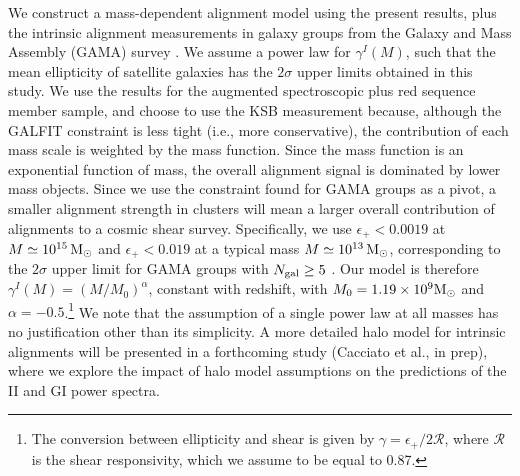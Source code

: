We construct a mass-dependent alignment model using the present results, plus the intrinsic 
alignment measurements in galaxy groups from the Galaxy and Mass Assembly (GAMA) survey 
\citep{schneider13}. We assume a power law for $\gamma^I(M)$, such that the mean ellipticity of 
satellite galaxies has the $2\sigma$ upper limits obtained in this study. We use the results for 
the augmented spectroscopic plus red sequence member sample, and choose to use the KSB measurement 
because, although the GALFIT constraint is less tight (i.e., more conservative), the contribution 
of each mass scale is weighted by the mass function. Since the mass function is an exponential 
function of mass, the overall alignment signal is dominated by lower mass objects. Since we use the 
constraint found for GAMA groups as a pivot, a smaller alignment strength in clusters will mean a 
larger overall contribution of alignments to a cosmic shear survey. Specifically, we use 
$\epsilon_+<0.0019$ at $M\simeq10^{15}\,{\rm M}_\odot$ and $\epsilon_+<0.019$ at a typical mass 
$M\simeq10^{13}\,{\rm M}_\odot$, corresponding to the $2\sigma$ upper limit for GAMA groups with $N_{\rm 
gal}\geq5$ \citep{schneider13}. Our model is therefore $\gamma^I(M)=(M/M_0)^{\alpha}$, constant 
with redshift, with $M_0 = 1.19\times10^9{\rm M}_\odot$ and $\alpha=-0.5$.\footnote{The conversion 
between ellipticity and shear is given by $\gamma=\epsilon_+/2\mathcal{R}$, where $\mathcal{R}$ is 
the shear responsivity, which we assume to be equal to 0.87.} We note that the assumption of a 
single power law at all masses has no justification other than its simplicity. A more detailed halo 
model for intrinsic alignments will be presented in a forthcoming study (Cacciato et al., in prep), 
where we explore the impact of halo model assumptions on the predictions of the II and GI power 
spectra.

